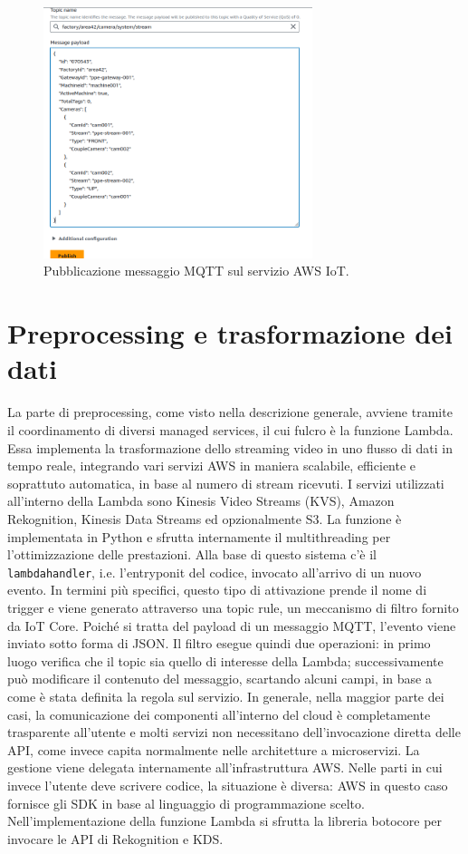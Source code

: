 \begin{figure}[htbp]
    \centering
    \includegraphics[width=0.7\textwidth]{figures/publish-example.png}
    \caption{Pubblicazione messaggio MQTT sul servizio AWS IoT.} 
    \label{fig:IoT-publish}
\end{figure}

 
\section{Preprocessing e trasformazione dei dati}
La parte di preprocessing, come visto nella descrizione generale, avviene tramite il coordinamento di diversi managed services, il cui fulcro è la funzione Lambda. Essa implementa la trasformazione dello streaming video in uno flusso di dati in tempo reale, integrando vari servizi AWS in maniera scalabile, efficiente e soprattuto automatica, in base al numero di stream ricevuti. I servizi utilizzati all'interno della Lambda sono Kinesis Video Streams (KVS), Amazon Rekognition, Kinesis Data Streams ed opzionalmente S3. La funzione è implementata in Python e sfrutta internamente il multithreading per l'ottimizzazione delle prestazioni. Alla base di questo sistema c'è il \texttt{lambda\textunderscore handler}, i.e. l'entryponit del codice, invocato all’arrivo di un nuovo evento. In termini più specifici, questo tipo di attivazione prende il nome di trigger e viene generato attraverso una topic rule, un meccanismo di filtro fornito da IoT Core. Poiché si tratta del payload di un messaggio MQTT, l'evento viene inviato sotto forma di JSON. Il filtro esegue quindi due operazioni: in primo luogo verifica che il topic sia quello di interesse della Lambda; successivamente può modificare il contenuto del messaggio, scartando alcuni campi, in base a come è stata definita la regola sul servizio. In generale, nella maggior parte dei casi, la comunicazione dei componenti all'interno del cloud è completamente trasparente all'utente e molti servizi non necessitano dell'invocazione diretta delle API, come invece capita normalmente nelle architetture a microservizi. La gestione viene delegata internamente all'infrastruttura AWS. Nelle parti in cui invece l'utente deve scrivere codice, la situazione è diversa: AWS in questo caso fornisce gli SDK in base al linguaggio di programmazione scelto. Nell'implementazione della funzione Lambda si sfrutta la libreria botocore per invocare le API di Rekognition e KDS.

